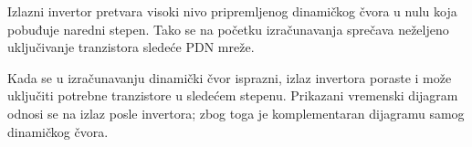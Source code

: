 Izlazni invertor pretvara visoki nivo pripremljenog dinamičkog čvora u nulu koja pobuđuje naredni stepen. Tako se na početku izračunavanja sprečava neželjeno uključivanje tranzistora sledeće PDN mreže.

Kada se u izračunavanju dinamički čvor isprazni, izlaz invertora poraste i može uključiti potrebne tranzistore u sledećem stepenu. Prikazani vremenski dijagram odnosi se na izlaz posle invertora; zbog toga je komplementaran dijagramu samog dinamičkog čvora.
